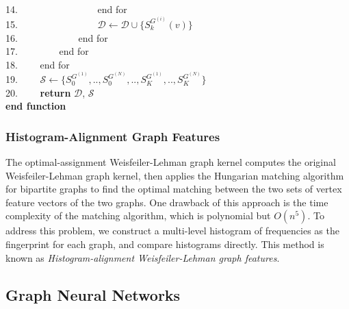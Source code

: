 \documentclass[a4paper]{article}
\begin{document}
14. \ \ \ \ \ \ \ \ \ \ \ \ \ \ \ \ end for \\
15. \ \ \ \ \ \ \ \ \ \ \ \ \ \ \ \ $\mathcal{D} \leftarrow \mathcal{D} \cup \{S^{G^{(i)}}_k(v)\}$ \\
16. \ \ \ \ \ \ \ \ \ \ \ \ end for \\
17. \ \ \ \ \ \ \ \ end for \\
18. \ \ \ \ end for \\
19. \ \ \ \ $\mathcal{S} \leftarrow \{S^{G^{(1)}}_0, .., S^{G^{(N)}}_0, .., S^{G^{(1)}}_K, .., S^{G^{(N)}}_K\}$ \\
20. \ \ \ \ \textbf{return} $\mathcal{D}$, $\mathcal{S}$ \\
\textbf{end function}

\subsubsection{Histogram-Alignment Graph Features}

The optimal-assignment Weisfeiler-Lehman graph kernel \cite{Nils} computes the original Weisfeiler-Lehman graph kernel, then applies the Hungarian matching algorithm for bipartite graphs to find the optimal matching between the two sets of vertex feature vectors of the two graphs. One drawback of this approach is the time complexity of the matching algorithm, which is polynomial but $O(n^5)$. To address this problem, we construct a multi-level histogram of frequencies as the fingerprint for each graph, and compare histograms directly. This method is known as \textit{Histogram-alignment Weisfeiler-Lehman graph features}. 

\subsection{Graph Neural Networks}
\end{document}
